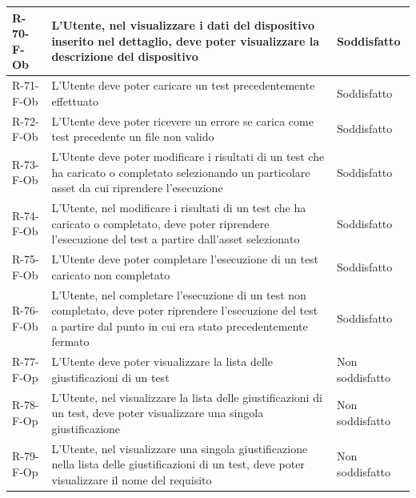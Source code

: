 \documentclass[a4paper,12pt]{article}
\begin{document}
{{\begin{longtable}{|l|p{}|p{}|}
                R-70-F-Ob       & L'Utente, nel visualizzare i dati del dispositivo inserito nel dettaglio, deve poter visualizzare la descrizione del dispositivo                                                            & Soddisfatto \\ \hline
                R-71-F-Ob       & L'Utente deve poter caricare un test precedentemente effettuato                                                                                                                             & Soddisfatto \\ \hline
                R-72-F-Ob       & L'Utente deve poter ricevere un errore se carica come test precedente un file non valido                                                                                                    & Soddisfatto \\ \hline
                R-73-F-Ob       & L'Utente deve poter modificare i risultati di un test che ha caricato o completato selezionando un particolare asset da cui riprendere l'esecuzione                                         & Soddisfatto \\ \hline
                R-74-F-Ob       & L'Utente, nel modificare i risultati di un test che ha caricato o completato, deve poter riprendere l'esecuzione del test a partire dall'asset selezionato                                  & Soddisfatto \\ \hline
                R-75-F-Ob       & L'Utente deve poter completare l'esecuzione di un test caricato non completato                                                                                                              & Soddisfatto \\ \hline
                R-76-F-Ob       & L'Utente, nel completare l'esecuzione di un test non completato, deve poter riprendere l'esecuzione del test a partire dal punto in cui era stato precedentemente fermato                   & Soddisfatto \\ \hline
                R-77-F-Op       & L'Utente deve poter visualizzare la lista delle giustificazioni di un test                                                                                                                  & Non soddisfatto \\ \hline
                R-78-F-Op       & L'Utente, nel visualizzare la lista delle giustificazioni di un test, deve poter visualizzare una singola giustificazione                                                                   & Non soddisfatto \\ \hline
                R-79-F-Op       & L'Utente, nel visualizzare una singola giustificazione nella lista delle giustificazioni di un test, deve poter visualizzare il nome del requisito                                          & Non soddisfatto \\ \hline

\end{longtable}}}
\end{document}
